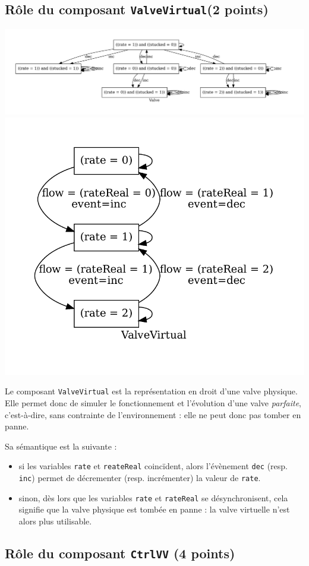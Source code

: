 \documentclass[a4paper]{book}
\begin{document}
\subsection{Rôle du composant {\tt ValveVirtual}(2 points)}
\includegraphics[height=.2\textheight,width=.5\textwidth]{Graphs/Valve-modes.pdf}
\includegraphics[height=.2\textheight,width=.5\textwidth]{Graphs/ValveVirtual-modes.pdf}

Le composant \texttt{ValveVirtual} est la représentation en droit d'une valve
physique. Elle permet donc de simuler le fonctionnement et l'évolution d'une
valve \textit{parfaite}, c'est-à-dire, sans contrainte de l'environnement :
elle ne peut donc pas tomber en panne.

Sa sémantique est la suivante :
\begin{itemize}
  \item si les variables \texttt{rate} et \texttt{reateReal} coincïdent, alors l'évènement \texttt{dec} (resp. \texttt{inc})
    permet de décrementer (resp. incrémenter) la valeur de \texttt{rate}.
  \item sinon, dès lors que les variables \texttt{rate} et \texttt{rateReal} se
    désynchronisent, cela signifie que la valve physique est tombée en panne : la valve virtuelle
    n'est alors plus utilisable.
\end{itemize}

\subsection{Rôle du composant {\tt CtrlVV} (4 points)}
\end{document}
